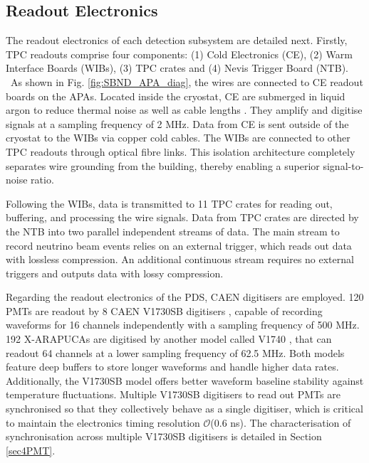 \subsection{Readout Electronics}
\label{sec:readout}

The readout electronics of each detection subsystem are detailed next.
Firstly, TPC readouts comprise four components: (1) Cold Electronics (CE), (2) Warm Interface Boards (WIBs), (3) TPC crates and (4) Nevis Trigger Board (NTB). %
\ As shown in Fig. \ref{fig:SBND_APA_diag}, the wires are connected to CE readout boards on the APAs.
Located inside the cryostat, CE are submerged in liquid argon to reduce thermal noise as well as cable lengths \cite{SBND_CE}.
They amplify and digitise signals at a sampling frequency of 2 MHz. 
Data from CE is sent outside of the cryostat to the WIBs via copper cold cables.              
The WIBs are connected to other TPC readouts through optical fibre links.
This isolation architecture completely separates wire grounding from the building, thereby enabling a superior signal-to-noise ratio.

Following the WIBs, data is transmitted to 11 TPC crates for reading out, buffering, and processing the wire signals. 
Data from TPC crates are directed by the NTB into two parallel independent streams of data.
The main stream to record neutrino beam events relies on an external trigger, which reads out data with lossless compression.
An additional continuous stream requires no external triggers and outputs data with lossy compression. 

Regarding the readout electronics of the PDS, CAEN digitisers are employed. %
120 PMTs are readout by 8 CAEN V1730SB digitisers \cite{caen1730}, capable of recording waveforms for 16 channels independently with a sampling frequency of 500 MHz.
192 X-ARAPUCAs are digitised by another model called V1740 \cite{caen1740}, that can readout 64 channels at a lower sampling frequency of 62.5 MHz.
Both models feature deep buffers to store longer waveforms and handle higher data rates.
Additionally, the V1730SB model offers better waveform baseline stability against temperature fluctuations.
Multiple V1730SB digitisers to read out PMTs are synchronised so that they collectively behave as a single digitiser, which is critical to maintain the electronics timing resolution $\mathcal{O}$(0.6 ns).
The characterisation of synchronisation across multiple V1730SB digitisers is detailed in Section \ref{sec4PMT}.


